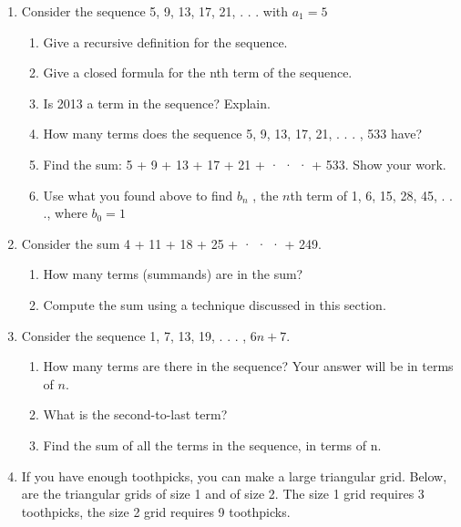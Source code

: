 \documentclass[11pt]{article} %
\newcommand\setItemNumber[1]{\setcounter{enumi}{\numexpr#1-1\relax}}
\begin{document}
        \begin{enumerate}

            \item Consider the sequence 5, 9, 13, 17, 21, . . . with $a_1 = 5$
                \begin{enumerate}

                \item Give a recursive definition for the sequence.
                \item Give a closed formula for the nth term of the sequence.
                \item Is 2013 a term in the sequence? Explain.
                \item How many terms does the sequence 5, 9, 13, 17, 21, . . . , 533 have?
                \item Find the sum: 5 + 9 + 13 + 17 + 21 + · · · + 533. Show your work.
                \item Use what you found above to find $b_n$ , the $n$th term of 1, 6, 15, 28, 45, . . ., where $b_0 = 1$
                \end{enumerate}


            \setItemNumber{3}
            \item Consider the sum 4 + 11 + 18 + 25 + · · · + 249.
                \begin{enumerate}
                    \item How many terms (summands) are in the sum?
                    \item Compute the sum using a technique discussed in this section.
                \end{enumerate}

            \item Consider the sequence 1, 7, 13, 19, . . . , $6n + 7$.
                \begin{enumerate}
                    \item How many terms are there in the sequence? Your answer will be in terms of $n$.
                    \item What is the second-to-last term?
                    \item Find the sum of all the terms in the sequence, in terms of n.
                \end{enumerate}


            \setItemNumber{13}
            \item If you have enough toothpicks, you can make a large triangular grid. Below, are the triangular grids of size 1 and of size 2. The size 1 grid requires 3 toothpicks, the size 2 grid requires 9 toothpicks.


\end{enumerate}
\end{document}
